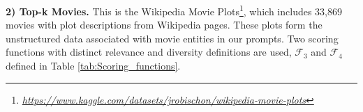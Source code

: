 \begin{comment}
  \begin{itemize}
  \item \(\mathcal{F}_1\): 
    \begin{itemize}
      \item Relevance definition: "Hotel rating"
      \item Diversity definition: "Physical distance between hotels"
    \end{itemize}
  \item \(\mathcal{F}_2\):
    \begin{itemize}
      \item Relevance definition: "Proximity to city center"
      \item Diversity definition: "Star rating"
    \end{itemize}
\end{itemize}  
\end{comment}


\noindent \textbf{2) Top-k Movies.} 
This is the Wikipedia Movie Plots\footnote{\it {\it \href{https://www.kaggle.com/datasets/jrobischon/wikipedia-movie-plots}{https://www.kaggle.com/datasets/jrobischon/wikipedia-movie-plots}}}, which includes 33,869 movies with  plot descriptions from Wikipedia pages. These plots form the unstructured data associated with movie entities in our prompts. Two scoring functions with distinct relevance and diversity definitions are used, \(\mathcal{F}_3\) and \(\mathcal{F}_4\) defined in Table \ref{tab:Scoring_functions}.

\begin{comment}
    \begin{itemize}
  \item \(\mathcal{F}_3\): 
    \begin{itemize}
      \item Relevance definition: "Brief plot"
      \item Diversity definition: "Production year"
    \end{itemize}
  \item \(\mathcal{F}_4\):
    \begin{itemize}
      \item Relevance definition: "Popularity"
      \item Diversity definition: "Genres \& movie eras"
    \end{itemize}
\end{itemize}
\end{comment}


